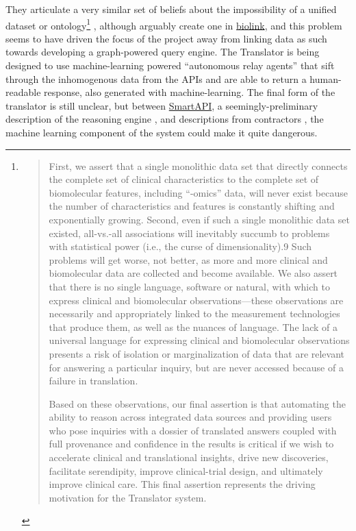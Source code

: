 \documentclass[10pt]{tufte-book}
\begin{document}
They articulate a very similar set of beliefs about the impossibility of
a unified dataset or ontology\footnote{\begin{quote}
  First, we assert that a single monolithic data set that directly
  connects the complete set of clinical characteristics to the complete
  set of biomolecular features, including ``-omics'' data, will never
  exist because the number of characteristics and features is constantly
  shifting and exponentially growing. Second, even if such a single
  monolithic data set existed, all-vs.-all associations will inevitably
  succumb to problems with statistical power (i.e., the curse of
  dimensionality).9 Such problems will get worse, not better, as more
  and more clinical and biomolecular data are collected and become
  available. We also assert that there is no single language, software
  or natural, with which to express clinical and biomolecular
  observations---these observations are necessarily and appropriately
  linked to the measurement technologies that produce them, as well as
  the nuances of language. The lack of a universal language for
  expressing clinical and biomolecular observations presents a risk of
  isolation or marginalization of data that are relevant for answering a
  particular inquiry, but are never accessed because of a failure in
  translation.

  Based on these observations, our final assertion is that automating
  the ability to reason across integrated data sources and providing
  users who pose inquiries with a dossier of translated answers coupled
  with full provenance and confidence in the results is critical if we
  wish to accelerate clinical and translational insights, drive new
  discoveries, facilitate serendipity, improve clinical-trial design,
  and ultimately improve clinical care. This final assertion represents
  the driving motivation for the Translator system. \citep{consortiumUniversalBiomedicalData2019} 
  \end{quote}}\citep{consortiumUniversalBiomedicalData2019} ,
although arguably create one in
\href{https://biolink.github.io/biolink-model/docs/}{biolink}, and this
problem seems to have driven the focus of the project away from linking
data as such towards developing a graph-powered query engine. The
Translator is being designed to use machine-learning powered
``autonomous relay agents'' that sift through the inhomogenous data from
the APIs and are able to return a human-readable response, also
generated with machine-learning. The final form of the translator is
still unclear, but between
\href{https://smart-api.info/portal/translator}{SmartAPI}, a
seemingly-preliminary description of the reasoning engine \citep{goelExplanationContainerCaseBased2021} , and descriptions from
contractors \citep{ROBOKOPCoVar2021} , the machine learning
component of the system could make it quite dangerous.
\end{document}
